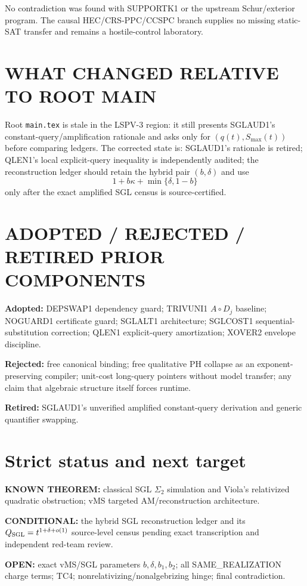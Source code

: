 \documentclass[11pt]{article}
\begin{document}
No contradiction was found with SUPPORTK1 or the upstream Schur/exterior program. The causal HEC/CRS-PPC/CCSPC branch supplies no missing static-SAT transfer and remains a hostile-control laboratory.

\section*{WHAT CHANGED RELATIVE TO ROOT MAIN}
Root \texttt{main.tex} is stale in the LSPV-3 region: it still presents SGLAUD1's constant-query/amplification rationale and asks only for $(q(t),S_{\max}(t))$ before comparing ledgers. The corrected state is: SGLAUD1's rationale is retired; QLEN1's local explicit-query inequality is independently audited; the reconstruction ledger should retain the hybrid pair $(b,\delta)$ and use
\[
1+b\kappa+\min\{\delta,1-b\}
\]
only after the exact amplified SGL census is source-certified.

\section*{ADOPTED / REJECTED / RETIRED PRIOR COMPONENTS}
\textbf{Adopted:} DEPSWAP1 dependency guard; TRIVUNI1 $A\circ D_j$ baseline; NOGUARD1 certificate guard; SGLALT1 architecture; SGLCOST1 sequential-substitution correction; QLEN1 explicit-query amortization; XOVER2 envelope discipline.

\textbf{Rejected:} free canonical binding; free qualitative PH collapse as an exponent-preserving compiler; unit-cost long-query pointers without model transfer; any claim that algebraic structure itself forces runtime.

\textbf{Retired:} SGLAUD1's unverified amplified constant-query derivation and generic quantifier swapping.

\section*{Strict status and next target}
\textbf{KNOWN THEOREM:} classical SGL $\Sigma_2$ simulation and Viola's relativized quadratic obstruction; vMS targeted AM/reconstruction architecture.

\textbf{CONDITIONAL:} the hybrid SGL reconstruction ledger and its $Q_{\rm SGL}=t^{1+\delta+o(1)}$ source-level census pending exact transcription and independent red-team review.

\textbf{OPEN:} exact vMS/SGL parameters $b,\delta,b_1,b_2$; all SAME\_REALIZATION charge terms; TC4; nonrelativizing/nonalgebrizing hinge; final contradiction.
\end{document}
